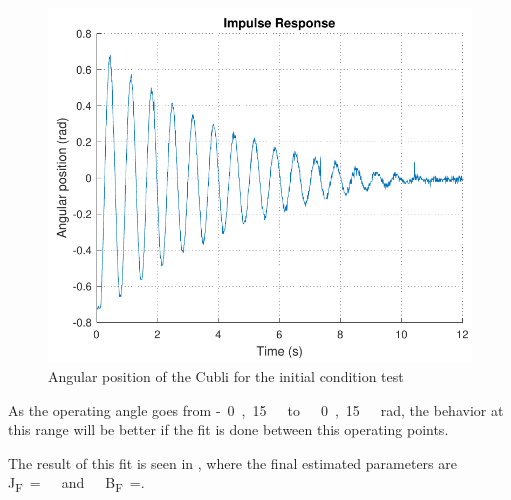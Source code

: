 \begin{figure}[H]
	\centering
	\includegraphics[scale=0.6]{figures/ImpRad}
	\caption{Angular position of the Cubli for the initial condition test}
	\label{cubliInitCondTest}
\end{figure}

As the operating angle goes from \si{-0,15\ to\ 0,15\ rad}, the behavior at this range will be better if the fit is done between this operating points.

The result of this fit is seen in \figref{}, where the final estimated parameters are \si{J_F=\ and\ B_F=}.


